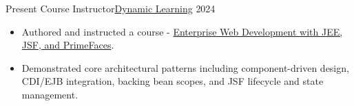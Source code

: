%
%
%
\begin{experiences}
  \experience
    {Present}   {Course Instructor}{\href{https://dynamic-learning.innovatorslab.net/}{Dynamic Learning}} {}
    {2024} {
                      \begin{itemize}
                        \item Authored and instructed a course - {\href{https://dynamic-learning.innovatorslab.net/course/index.php?page=courses&courseid=35}{Enterprise Web Development with JEE, JSF, and PrimeFaces}}. {\href{https://www.youtube.com/playlist?list=PLvzgcI0UCIWbGgvPQioP789FTLocObG3v}{\faYoutubePlay}}
                        \item Demonstrated core architectural patterns including component-driven design, CDI/EJB integration, backing bean scopes, and JSF lifecycle and state management.

                      \end{itemize}
                    }
                    {}
  \emptySeparator

\end{experiences}

\vspace{-2em}